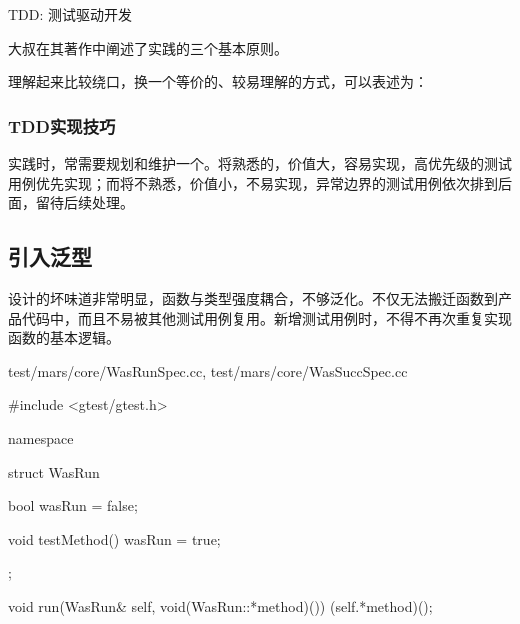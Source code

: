 \begin{content}
\begin{episode}{TDD: 测试驱动开发}
\begin{content}
大叔在其著作中阐述了实践的三个基本原则。

\begin{enum}
\end{enum}

理解起来比较绕口，换一个等价的、较易理解的方式，可以表述为：

\begin{enum}
\end{enum}

\subsubsection{TDD实现技巧}

实践时，常需要规划和维护一个。将熟悉的，价值大，容易实现，高优先级的测试用例优先实现；而将不熟悉，价值小，不易实现，异常边界的测试用例依次排到后面，留待后续处理。

\begin{enum}
\end{enum}

\end{content}

\end{episode}

\subsection{引入泛型}

设计的坏味道非常明显，函数与类型强度耦合，不够泛化。不仅无法搬迁函数到产品代码中，而且不易被其他测试用例复用。新增测试用例时，不得不再次重复实现函数的基本逻辑。

\begin{diff}{test/mars/core/WasRunSpec.cc, test/mars/core/WasSuccSpec.cc}
\begin{minicpp}
#include <gtest/gtest.h>

namespace {
  struct WasRun {
    bool wasRun = false;

    void testMethod() {
      wasRun = true;
    }
  };

  void run(WasRun& self, void(WasRun::*method)()) {
    (self.*method)();
  }
}


\end{minicpp}
\end{diff}
\end{content}
